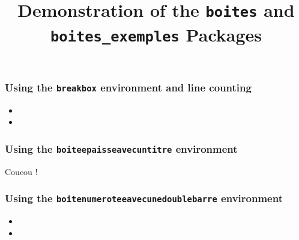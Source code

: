 \documentclass[a4paper,10pt]{article}
\begin{document}
\title{Demonstration of the \texttt{boites} and \texttt{boites\_exemples} Packages}
\date{}
\maketitle

\subsubsection*{Using the \texttt{breakbox} environment and line counting}

\begin{Example}
  \bkcounttrue
  \begin{breakbox}
    \begin{itemize}
      \item \lipsum[1]
      \item \lipsum[2]
    \end{itemize}
  \end{breakbox}
\end{Example}

\subsubsection*{Using the \texttt{boiteepaisseavecuntitre} environment}

\begin{Example}
  \begin{boiteepaisseavecuntitre}{ Coucou ! }
    \lipsum[1-3]
  \end{boiteepaisseavecuntitre}
\end{Example}

\subsubsection*{Using the \texttt{boitenumeroteeavecunedoublebarre} environment}

\begin{Example}
  \begin{boitenumeroteeavecunedoublebarre}{3.5}
    \lipsum[1-3]
  \end{boitenumeroteeavecunedoublebarre}
\end{Example}

\begin{Example}
  \begin{boitenumeroteeavecunedoublebarre}{3.5}
    \begin{itemize}
      \item \lipsum[1]
      \item \lipsum[2]
    \end{itemize}
  \end{boitenumeroteeavecunedoublebarre}
\end{Example}
\end{document}

